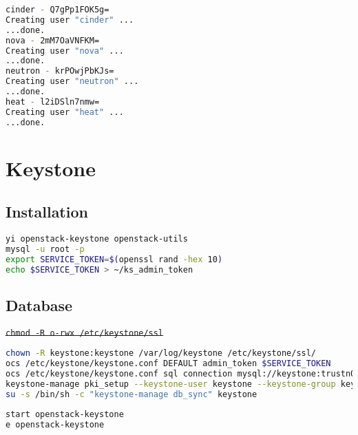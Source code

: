 \documentclass[11pt,letterpaper,oneside]{book}
\begin{document}
\begin{lstlisting}[caption={Result from user account creation},language=bash]
cinder - Q7gPp1FOK5g=
Creating user "cinder" ...
...done.
nova - 2mM7OaVNFKM=
Creating user "nova" ...
...done.
neutron - krPOwjPbKJs=
Creating user "neutron" ...
...done.
heat - l2iDSln7nmw=
Creating user "heat" ...
...done.
\end{lstlisting}

\chapter{Keystone}

\section{Installation}
\begin{lstlisting}[caption={Install Keystone packages},language=bash]
yi openstack-keystone openstack-utils 
mysql -u root -p
export SERVICE_TOKEN=$(openssl rand -hex 10)
echo $SERVICE_TOKEN > ~/ks_admin_token
\end{lstlisting}

\section{Database}

\sout{\texttt{chmod -R o-rwx /etc/keystone/ssl}}
\begin{lstlisting}[caption={Keystone configuration},language=bash]
chown -R keystone:keystone /var/log/keystone /etc/keystone/ssl/
ocs /etc/keystone/keystone.conf DEFAULT admin_token $SERVICE_TOKEN
ocs /etc/keystone/keystone.conf sql connection mysql://keystone:trustn01@10.53.252.61/keystone
keystone-manage pki_setup --keystone-user keystone --keystone-group keystone 
su -s /bin/sh -c "keystone-manage db_sync" keystone
\end{lstlisting}

\begin{lstlisting}[caption={Start and enable Keystone},language=bash]
start openstack-keystone
e openstack-keystone
\end{lstlisting}
\end{document}
